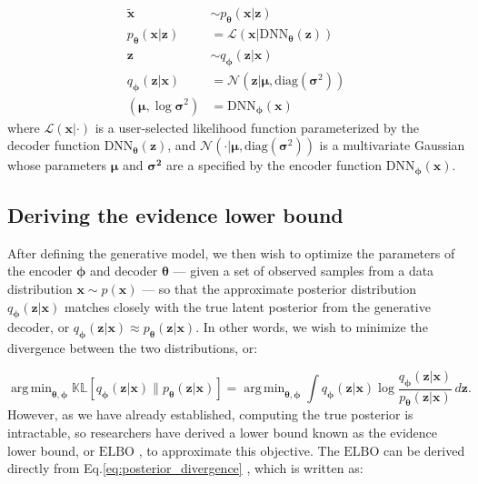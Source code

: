 \documentclass[11pt,a4paper,oneside]{book}
\DeclareMathOperator*{\argmin}{arg\,min}
\begin{document}
\begin{doublespace}
\begin{appendices}
\begin{subequations}
\begin{align}
    \tilde{\mathbf{x}} &\sim
    p_{\boldsymbol{\theta}}(\mathbf{x} | \mathbf{z}) \label{eq:recon}\\
    p_{\boldsymbol{\theta}}(\mathbf{x} | \mathbf{z}) &= \mathcal{L} \left( \mathbf{x} | \mathrm{DNN}_{\boldsymbol{\theta}}(\mathbf{z}) \right) \label{eq:likelihood}\\
    \mathbf{z} &\sim
    q_{\boldsymbol{\phi}}(\mathbf{z} | \mathbf{x})\label{eq:sample}\\
    q_{\boldsymbol{\phi}}(\mathbf{z} | \mathbf{x}) &= \mathcal{N}(\mathbf{z} | \boldsymbol{\mu}, \mathrm{diag}(\boldsymbol{\sigma}^2)) \label{eq:approx}\\
    (\boldsymbol{\mu}, \log \boldsymbol{\sigma}^2) &= \mathrm{DNN}_{\boldsymbol{\phi}}(\mathbf{x})\label{eq:encoder}
\end{align}
\end{subequations}
where $\mathcal{L}(\mathbf{x}| \cdot)$ is a user-selected likelihood function parameterized by the decoder function $\mathrm{DNN}_{\boldsymbol{\theta}}(\mathbf{z})$, and $\mathcal{N}(\cdot | \boldsymbol{\mu}, \mathrm{diag}(\boldsymbol{\sigma}^2))$ is a multivariate Gaussian whose parameters $\boldsymbol{\mu}$ and $\boldsymbol{\boldsymbol{\sigma}^2}$ are a specified by the encoder function $\mathrm{DNN}_{\boldsymbol{\phi}}(\mathbf{x})$. 

\subsection{Deriving the evidence lower bound}
\label{appendix:elbo}
After defining the generative model, we then wish to optimize the parameters of the encoder $\boldsymbol{\phi}$ and decoder $\boldsymbol{\theta}$ --- given a set of observed samples from a data distribution $\mathbf{x} \sim p(\mathbf{x})$ --- so that the approximate posterior distribution $q_{\boldsymbol{\phi}}(\mathbf{z} | \mathbf{x})$ matches closely with the true latent posterior from the generative decoder, or $q_{\boldsymbol{\phi}}(\mathbf{z} | \mathbf{x}) \approx p_{\boldsymbol{\theta}}(\mathbf{z} | \mathbf{x})$. In other words, we wish to minimize the divergence between the two distributions, or:

\begin{equation}
    \label{eq:posterior_divergence}
    \argmin_{\boldsymbol{\theta}, \boldsymbol{\phi}} \mathbb{KL}[q_{\boldsymbol{\phi}}(\mathbf{z} | \mathbf{x}) \| p_{\boldsymbol{\theta}}(\mathbf{z} | \mathbf{x})] = \argmin_{\boldsymbol{\theta}, \boldsymbol{\phi}} \int q_{\boldsymbol{\phi}}(\mathbf{z} | \mathbf{x}) \log \frac{q_{\boldsymbol{\phi}}(\mathbf{z} | \mathbf{x})}{p_{\boldsymbol{\theta}}(\mathbf{z} | \mathbf{x})} \, d{\mathbf{z}}.
\end{equation}
However, as we have already established, computing the true posterior is intractable, so researchers have derived a lower bound known as the evidence lower bound, or $\mathrm{ELBO}$ \citep{kingma2013vae}, to approximate this objective. The $\mathrm{ELBO}$ can be derived directly from Eq.\ref{eq:posterior_divergence} \citep{adams2020}, which is written as:


\end{appendices}
\end{doublespace}
\end{document}
